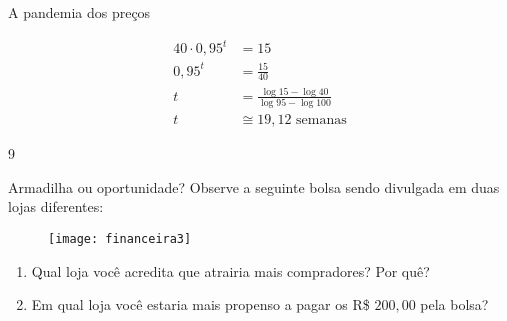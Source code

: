 \begin{answer}{A pandemia dos preços}
{\begin{enumerate}
\begin{align*}
40\cdot0{,}95^t&=15\\
0{,}95^t&=\frac{15}{40}\\
t&=\frac{\log15-\log40}{\log95-\log100}\\
t&\cong19{,}12\text{ semanas}
\end{align*}

\end{enumerate}
}{9}
\end{answer}

\label{fin-prac-1}

\begin{task}{Armadilha ou oportunidade?}
\label{fin-ativ-3}
Observe a seguinte bolsa sendo divulgada em duas lojas diferentes:

\begin{figure}[H]
\centering

\texttt{[image: financeira3]}
\end{figure}

\begin{enumerate}
  \item Qual loja você acredita que atrairia mais compradores? Por quê?
  \item Em qual loja você estaria mais propenso a pagar os R\$ $200{,}00$ pela bolsa?
\end{enumerate}
\end{task}


